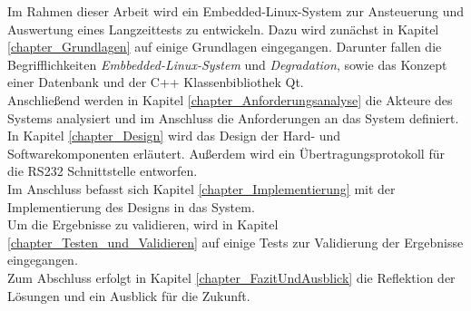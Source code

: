 Im Rahmen dieser Arbeit wird ein Embedded-Linux-System zur Ansteuerung und Auswertung eines Langzeittests zu entwickeln. Dazu wird zunächst in Kapitel \ref{chapter_Grundlagen} auf einige Grundlagen eingegangen. Darunter fallen die Begrifflichkeiten \textit{Embbedded-Linux-System} und \textit{Degradation}, sowie das Konzept einer Datenbank und der C++ Klassenbibliothek Qt.\\
Anschließend werden in Kapitel \ref{chapter_Anforderungsanalyse} die Akteure des Systems analysiert und im Anschluss die Anforderungen an das System definiert.\\
In Kapitel \ref{chapter_Design} wird das Design der Hard- und Softwarekomponenten erläutert. Außerdem wird ein Übertragungsprotokoll für die RS232 Schnittstelle entworfen.\\
Im Anschluss befasst sich Kapitel \ref{chapter_Implementierung} mit der Implementierung des Designs in das System.\\
Um die Ergebnisse zu validieren, wird in Kapitel \ref{chapter_Testen_und_Validieren} auf einige Tests zur Validierung der Ergebnisse eingegangen.\\
Zum Abschluss erfolgt in Kapitel \ref{chapter_FazitUndAusblick} die Reflektion der Lösungen und ein Ausblick für die Zukunft.